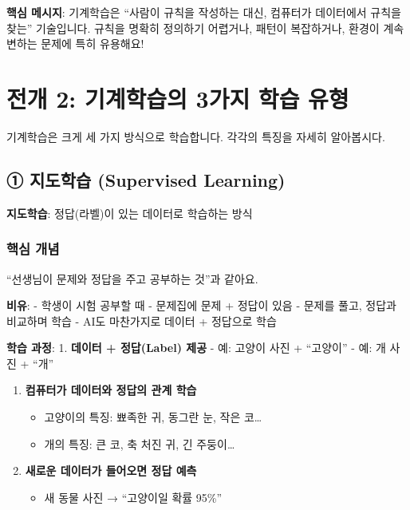\documentclass[a4paper, 11pt]{article}
\providecommand{\tightlist}{%
  \setlength{\itemsep}{0pt}\setlength{\parskip}{0pt}}
\renewenvironment{quote}
  {\begin{tcolorbox}[colback=lightblue!30, colframe=mainblue!50,
   left=8pt, right=8pt, top=4pt, bottom=4pt, breakable]}
  {\end{tcolorbox}}
\begin{document}
\begin{quote}
 \textbf{핵심 메시지}: 기계학습은 ``사람이 규칙을 작성하는 대신,
컴퓨터가 데이터에서 규칙을 찾는'' 기술입니다. 규칙을 명확히 정의하기
어렵거나, 패턴이 복잡하거나, 환경이 계속 변하는 문제에 특히 유용해요!
\end{quote}

\hypertarget{uxc804uxac1c-2-uxae30uxacc4uxd559uxc2b5uxc758-3uxac00uxc9c0-uxd559uxc2b5-uxc720uxd615}{%
\section{ 전개 2: 기계학습의 3가지 학습
유형}\label{uxc804uxac1c-2-uxae30uxacc4uxd559uxc2b5uxc758-3uxac00uxc9c0-uxd559uxc2b5-uxc720uxd615}}

기계학습은 크게 세 가지 방식으로 학습합니다. 각각의 특징을 자세히
알아봅시다.

\hypertarget{uxc9c0uxb3c4uxd559uxc2b5-supervised-learning}{%
\subsection{\textbf{①} 지도학습 (Supervised
Learning)}\label{uxc9c0uxb3c4uxd559uxc2b5-supervised-learning}}

\begin{quote}
\textbf{지도학습}: 정답(라벨)이 있는 데이터로 학습하는 방식
\end{quote}

\hypertarget{uxd575uxc2ec-uxac1cuxb150}{%
\subsubsection{핵심 개념}\label{uxd575uxc2ec-uxac1cuxb150}}

``선생님이 문제와 정답을 주고 공부하는 것''과 같아요.

\textbf{비유}: - 학생이 시험 공부할 때 - 문제집에 문제 + 정답이 있음 -
문제를 풀고, 정답과 비교하며 학습 - AI도 마찬가지로 데이터 + 정답으로
학습

\textbf{학습 과정}: 1. \textbf{데이터 + 정답(Label) 제공} - 예: 고양이
사진 + ``고양이'' - 예: 개 사진 + ``개''

\begin{enumerate}
\def\labelenumi{\arabic{enumi}.}
\setcounter{enumi}{1}
\tightlist
\item
  \textbf{컴퓨터가 데이터와 정답의 관계 학습}

  \begin{itemize}
  \tightlist
  \item
    고양이의 특징: 뾰족한 귀, 동그란 눈, 작은 코\ldots{}
  \item
    개의 특징: 큰 코, 축 처진 귀, 긴 주둥이\ldots{}
  \end{itemize}
\item
  \textbf{새로운 데이터가 들어오면 정답 예측}

  \begin{itemize}
  \tightlist
  \item
    새 동물 사진 → ``고양이일 확률 95\%''
  \end{itemize}
\end{enumerate}
\end{document}
